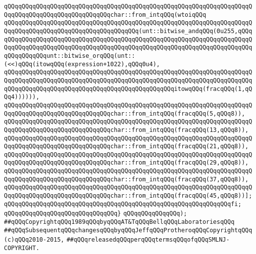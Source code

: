 \verb|qQQqqQQqqQQqqQQqqQQqqQQqqQQqqQQqqQQqqQQqqQQqqQQqqQQqqQQqqQQqqQQqqQQqqQQqqQQqqQQqqQQqqQQqqQQqqQQqqQQqchar::from_intqQQq(wtoiqQQq|\newline
\verb|qQQqqQQqqQQqqQQqqQQqqQQqqQQqqQQqqQQqqQQqqQQqqQQqqQQqqQQqqQQqqQQqqQQqqQQqqQQqqQQqqQQqqQQqqQQqqQQqqQQqqQQqqQQq(unt::bitwise_andqQQq(0u255,qQQq|\newline
\verb|qQQqqQQqqQQqqQQqqQQqqQQqqQQqqQQqqQQqqQQqqQQqqQQqqQQqqQQqqQQqqQQqqQQqqQQqqQQqqQQqqQQqqQQqqQQqqQQqqQQqqQQqqQQqqQQqqQQqqQQqqQQqqQQqqQQqqQQqqQQqqQQqqQQqqQQqunt::bitwise_orqQQq(unt::(<<)qQQq(itowqQQq(expression+1022),qQQq0u4),|\newline
\verb|qQQqqQQqqQQqqQQqqQQqqQQqqQQqqQQqqQQqqQQqqQQqqQQqqQQqqQQqqQQqqQQqqQQqqQQqqQQqqQQqqQQqqQQqqQQqqQQqqQQqqQQqqQQqqQQqqQQqqQQqqQQqqQQqqQQqqQQqqQQqqQQqqQQqqQQqqQQqqQQqqQQqqQQqqQQqqQQqqQQqqQQqqQQqitowqQQq(fracqQQq(1,qQQq4)))))),|\newline
\verb|qQQqqQQqqQQqqQQqqQQqqQQqqQQqqQQqqQQqqQQqqQQqqQQqqQQqqQQqqQQqqQQqqQQqqQQqqQQqqQQqqQQqqQQqqQQqqQQqqQQqchar::from_intqQQq(fracqQQq(5,qQQq8)),|\newline
\verb|qQQqqQQqqQQqqQQqqQQqqQQqqQQqqQQqqQQqqQQqqQQqqQQqqQQqqQQqqQQqqQQqqQQqqQQqqQQqqQQqqQQqqQQqqQQqqQQqqQQqchar::from_intqQQq(fracqQQq(13,qQQq8)),|\newline
\verb|qQQqqQQqqQQqqQQqqQQqqQQqqQQqqQQqqQQqqQQqqQQqqQQqqQQqqQQqqQQqqQQqqQQqqQQqqQQqqQQqqQQqqQQqqQQqqQQqqQQqchar::from_intqQQq(fracqQQq(21,qQQq8)),|\newline
\verb|qQQqqQQqqQQqqQQqqQQqqQQqqQQqqQQqqQQqqQQqqQQqqQQqqQQqqQQqqQQqqQQqqQQqqQQqqQQqqQQqqQQqqQQqqQQqqQQqqQQqchar::from_intqQQq(fracqQQq(29,qQQq8)),|\newline
\verb|qQQqqQQqqQQqqQQqqQQqqQQqqQQqqQQqqQQqqQQqqQQqqQQqqQQqqQQqqQQqqQQqqQQqqQQqqQQqqQQqqQQqqQQqqQQqqQQqqQQqchar::from_intqQQq(fracqQQq(37,qQQq8)),|\newline
\verb|qQQqqQQqqQQqqQQqqQQqqQQqqQQqqQQqqQQqqQQqqQQqqQQqqQQqqQQqqQQqqQQqqQQqqQQqqQQqqQQqqQQqqQQqqQQqqQQqqQQqchar::from_intqQQq(fracqQQq(45,qQQq8))];|\newline
\verb|qQQqqQQqqQQqqQQqqQQqqQQqqQQqqQQqqQQqqQQqqQQqqQQqqQQqqQQqqQQqqQQqfi;|\newline
\newline
\verb|qQQqqQQqqQQqqQQqqQQqqQQqqQQqqQQq}|\newline
\verb|qQQqqQQqqQQqqQQq);|\newline
\newline
\newline
\newline
\verb|##qQQqCopyrightqQQq1989qQQqbyqQQqAT&TqQQqBellqQQqLaboratoriesqQQq|\newline
\verb|##qQQqSubsequentqQQqchangesqQQqbyqQQqJeffqQQqProtheroqQQqCopyrightqQQq(c)qQQq2010-2015,|\newline
\verb|##qQQqreleasedqQQqperqQQqtermsqQQqofqQQqSMLNJ-COPYRIGHT.|\newline

